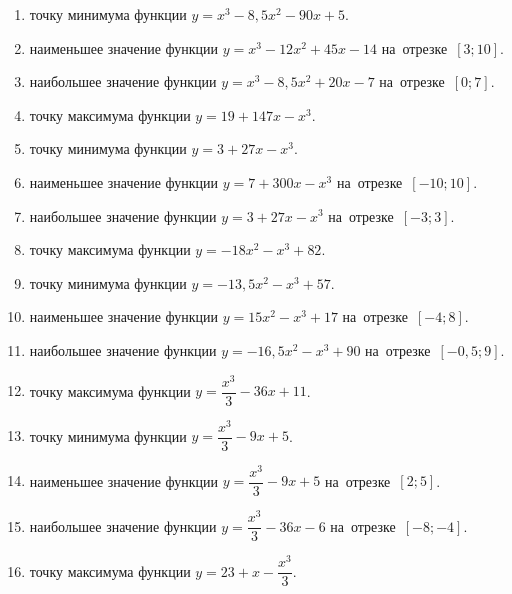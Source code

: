 \documentclass[a4paper,10pt]{article}
\begin{document}
\begin{enumerate}
\item {} точку минимума функции $y=x^3 -8,5x^2-90x+5$.

\item {} наименьшее значение функции $y=x^3 -12x^2+45x-14$ на~отрезке~$\left[3;10\right]$.

\item {} наибольшее значение функции $y=x^3 -8,5x^2+20x-7$ на~отрезке~$\left[0;7\right]$.

\item {} точку максимума функции $y=19+147x-x^3$.

\item {} точку минимума функции $y=3+27x-x^3$.

\item {} наименьшее значение функции $y=7+300x-x^3$ на~отрезке~$\left[-10;10\right]$.

\item {} наибольшее значение функции $y=3+27x-x^3$ на~отрезке~$\left[-3;3\right]$.

\item {} точку максимума функции $y=-18x^2-x^3+82$.

\item {} точку минимума функции $y=-13,5x^2-x^3+57$.

\item {} наименьшее значение функции $y=15x^2-x^3+17$ на~отрезке~$\left[-4;8\right]$.

\item {} наибольшее значение функции $y=-16,5x^2-x^3+90$ на~отрезке~$\left[-0,5;9\right]$.

\item {} точку максимума функции $y=\dfrac{x^3}{3} -36x+11$.

\item {} точку минимума функции $y=\dfrac{x^3}{3} -9x+5$.

\item {} наименьшее значение функции $y=\dfrac{x^3}{3} -9x+5$ на~отрезке~$\left[2;5\right]$.

\item {} наибольшее значение функции $y=\dfrac{x^3}{3} -36x-6$ на~отрезке~$\left[-8;-4\right]$.

\item {} точку максимума функции $y=23 +x-\dfrac{x^3}{3}$.


\end{enumerate}
\end{document}
